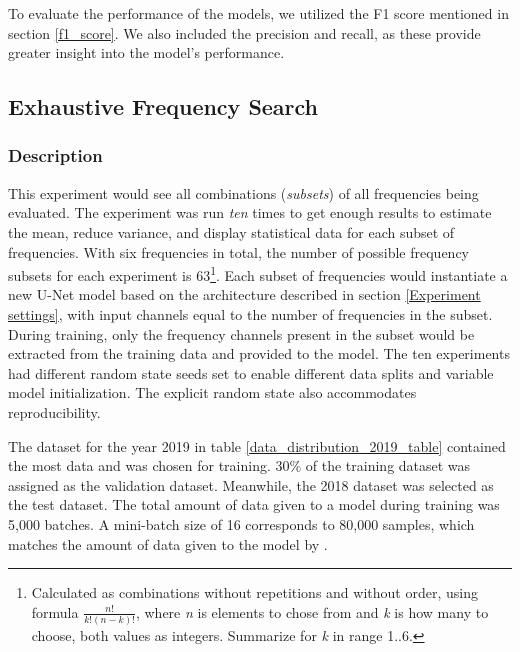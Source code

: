         To evaluate the performance of the models, we utilized the F1 score mentioned in section \ref{f1_score}. We also included the precision and recall, as these provide greater insight into the model's performance.
        
    
    \subsection{Exhaustive Frequency Search}
        \subsubsection{Description}
        This experiment would see all combinations (\textit{subsets}) of all frequencies being evaluated. The experiment was run \textit{ten} times to get enough results to estimate the mean, reduce variance, and display statistical data for each subset of frequencies. With six frequencies in total, the number of possible frequency subsets for each experiment is 63\footnote{Calculated as combinations without repetitions and without order, using formula $\frac{n!}{k!(n-k)!}$, where \textit{n} is elements to chose from and \textit{k} is how many to choose, both values as integers. Summarize for \textit{k} in range 1..6.}. Each subset of frequencies would instantiate a new U-Net model based on the architecture described in section \ref{Experiment settings}, with input channels equal to the number of frequencies in the subset. During training, only the frequency channels present in the subset would be extracted from the training data and provided to the model. The ten experiments had different random state seeds set to enable different data splits and variable model initialization. The explicit random state also accommodates reproducibility. 
        
        The dataset for the year 2019 in table \ref{data_distribution_2019_table} contained the most data and was chosen for training. 30\% of the training dataset was assigned as the validation dataset. Meanwhile, the 2018 dataset was selected as the test dataset. The total amount of data given to a model during training was 5,000 batches. A mini-batch size of 16 corresponds to 80,000 samples, which matches the amount of data given to the model by  \citeauthor{brautaset2020acoustic}\cite{brautaset2020acoustic}.
        
